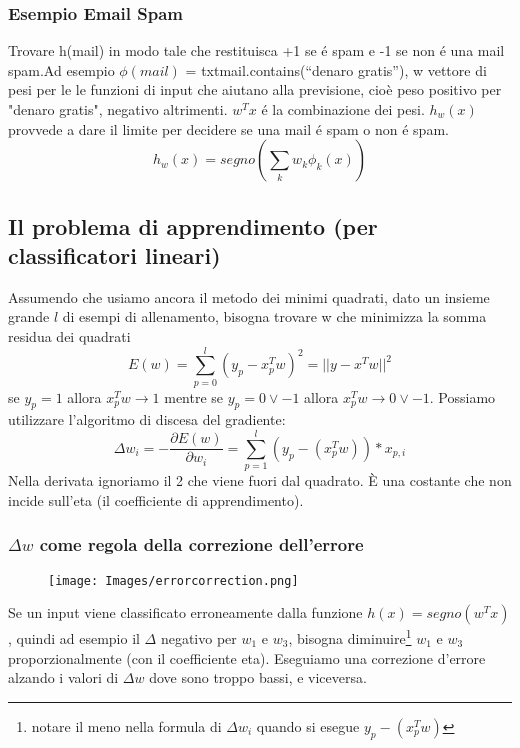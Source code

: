 \documentclass{article}
\begin{document}
\subsubsection{Esempio Email Spam}
Trovare h(mail) in modo tale che restituisca +1 se é spam e -1 se non é una mail spam.\newline  Ad esempio $\phi(mail)$ = txtmail.contains(“denaro gratis”), w vettore di pesi per le le funzioni di input che aiutano alla previsione, cioè peso positivo per "denaro gratis", negativo altrimenti. $w^Tx$ é la combinazione dei pesi. $h_w(x)$ provvede a dare il limite per decidere se una mail é spam o non é spam.
\begin{equation}
    h_w(x)= segno(\sum_{k} w_k\phi_k(x))
\end{equation}

\subsection{Il problema di apprendimento (per classificatori lineari)}
Assumendo che usiamo ancora il metodo dei minimi quadrati, dato un insieme grande $l$ di esempi di allenamento, bisogna trovare w che minimizza la somma residua dei quadrati
\begin{equation}
    E(w)=\sum_{p = 0}^l(y_p-x_p^Tw)^2=||y-x^Tw||^2
\end{equation}
se $y_p=1$ allora $x_p^Tw \rightarrow 1$ mentre se $y_p=0\lor -1$ allora $x_p^Tw \rightarrow 0 \lor -1$. \newline 
Possiamo utilizzare l'algoritmo di discesa del gradiente:
\begin{equation}
    \Delta w_i = - \frac{\partial E(w)}{\partial w_i} = \sum_{p=1}^l (y_p - (x_p^Tw)) * x_{p,i}
\end{equation}
Nella derivata ignoriamo il 2 che viene fuori dal quadrato. È una costante che non incide sull'eta (il coefficiente di apprendimento).

\subsubsection{$\Delta w$ come regola della correzione dell'errore}
\begin{figure}[H]
\centering
\texttt{[image: Images/errorcorrection.png]}
\end{figure}
Se un input viene classificato erroneamente dalla funzione $h(x)=segno(w^Tx)$, quindi ad esempio il $\Delta$ negativo per $w_1$ e $w_3$, bisogna diminuire\footnote{notare il meno nella formula di $\Delta w_i$ quando si esegue $y_p-(x_p^Tw)$} $w_1$ e $w_3$ proporzionalmente (con il coefficiente eta). Eseguiamo una correzione d'errore alzando i valori di $\Delta w$ dove sono troppo bassi, e viceversa.
\end{document}

